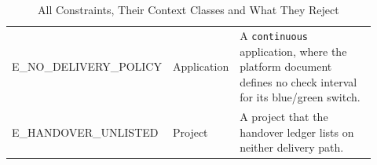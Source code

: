 \begin{table}[H]
\begin{tabular}{>{\raggedright\arraybackslash}p{0.39\linewidth}>{\raggedright\arraybackslash}p{0.14\linewidth}>{\raggedright\arraybackslash}p{0.39\linewidth}}
E\_NO\_DELIVERY\_POLICY & Application & A \texttt{continuous} application, where the platform document defines no check interval for its blue/green switch. \\
E\_HANDOVER\_UNLISTED & Project & A project that the handover ledger lists on neither delivery path. \\
\hline
\end{tabular}
\caption{All Constraints, Their Context Classes and What They Reject}
\label{tab:constraints}
\end{table}
